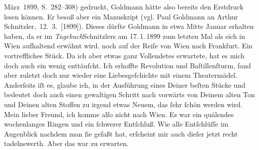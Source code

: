 \begin{ledgroupsized}[t]{13cm}
{{{                        März 1899, S. 282–308) gedruckt, Goldmann hätte also bereits den Erstdruck
                  lesen können. Er besaß aber ein Manuskript (vgl. Paul Goldmann an Arthur Schnitzler, 12. 3. [1899]). Dieses dürfte Goldmann in etwa Mitte Januar erhalten haben,
                  da er im \emph{Tagebuch}Schnitzlers am 17. 1. 1899 zum
                  letzten Mal als sich in Wien aufhaltend erwähnt
                  wird.}}}\label{K_L02868-2h} noch auf der Reiſe von Wien nach
                  Frankfurt. Ein vortreffliches Stück. Da ich aber etwas ganz Vollendetes
               erwartete, hat es mich doch auch ein wenig enttäuſcht. Ich erhoffte Revolution und
                  Baſtillenſturm, fand aber zuletzt doch nur
               wieder eine Liebesgeſchichte mit einem Theatermädel. Anderſeits iſt es, glaube ich,
               in der Ausführung eines Deiner beſten Stücke und bedeutet doch \strikeout{\textcolor{gray}{einen}} auch einen gewaltigen Schritt nach vorwärts  von Deinem alten Ton und Deinen alten
               Stoffen zu irgend etwas Neuem, das ſehr ſchön werden wird.\pend
           \pstart
           {\pb}Mein lieber Freund, ich komme alſo nicht nach Wien. Es war ein quälendes wochenlanges Ringen und
               ein ſchwerer Entſchluß. Wie alle Entſchlüſſe im Augenblick nachdem man ſie gefaßt
               hat, erſcheint mir auch dieſer jetzt recht tadelnswerth. Aber das war zu
               erwarten.\pend

\end{ledgroupsized}
